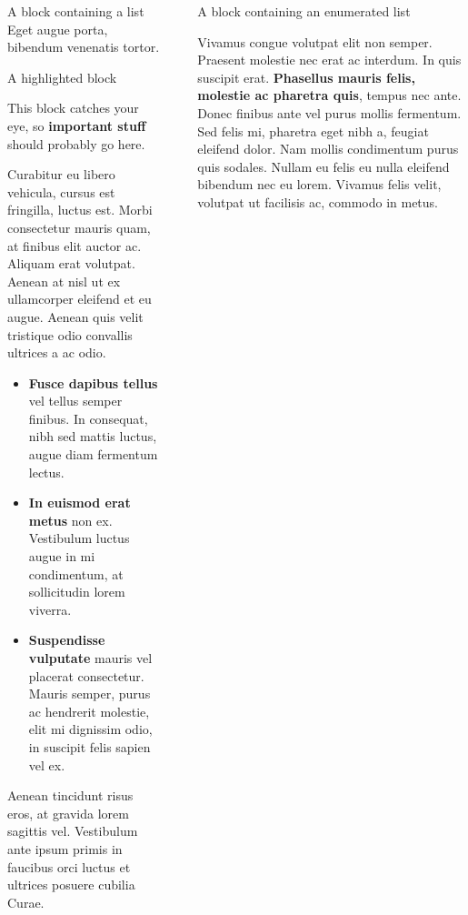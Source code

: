 \documentclass[final]{beamer}
\newlength{\sepwidth}
\newlength{\colwidth}
\newcommand{\separatorcolumn}{\begin{column}{\sepwidth}\end{column}}
\begin{document}
\begin{frame}[t]
\begin{columns}[t]
\begin{column}{\colwidth}
\begin{block}{A block containing a list}
    Eget augue porta, bibendum venenatis tortor.

  \end{block}

  \begin{alertblock}{A highlighted block}

    This block catches your eye, so \textbf{important stuff} should probably go
    here.

    Curabitur eu libero vehicula, cursus est fringilla, luctus est. Morbi
    consectetur mauris quam, at finibus elit auctor ac. Aliquam erat volutpat.
    Aenean at nisl ut ex ullamcorper eleifend et eu augue. Aenean quis velit
    tristique odio convallis ultrices a ac odio.

    \begin{itemize}
      \item \textbf{Fusce dapibus tellus} vel tellus semper finibus. In
        consequat, nibh sed mattis luctus, augue diam fermentum lectus.
      \item \textbf{In euismod erat metus} non ex. Vestibulum luctus augue in
        mi condimentum, at sollicitudin lorem viverra.
      \item \textbf{Suspendisse vulputate} mauris vel placerat consectetur.
        Mauris semper, purus ac hendrerit molestie, elit mi dignissim odio, in
        suscipit felis sapien vel ex.
    \end{itemize}

    Aenean tincidunt risus eros, at gravida lorem sagittis vel. Vestibulum ante
    ipsum primis in faucibus orci luctus et ultrices posuere cubilia Curae.

  \end{alertblock}

\end{column}

\separatorcolumn

\begin{column}{\colwidth}

  \begin{block}{A block containing an enumerated list}

    Vivamus congue volutpat elit non semper. Praesent molestie nec erat ac
    interdum. In quis suscipit erat. \textbf{Phasellus mauris felis, molestie
    ac pharetra quis}, tempus nec ante. Donec finibus ante vel purus mollis
    fermentum. Sed felis mi, pharetra eget nibh a, feugiat eleifend dolor. Nam
    mollis condimentum purus quis sodales. Nullam eu felis eu nulla eleifend
    bibendum nec eu lorem. Vivamus felis velit, volutpat ut facilisis ac,
    commodo in metus.


\end{block}
\end{column}
\end{columns}
\end{frame}
\end{document}
